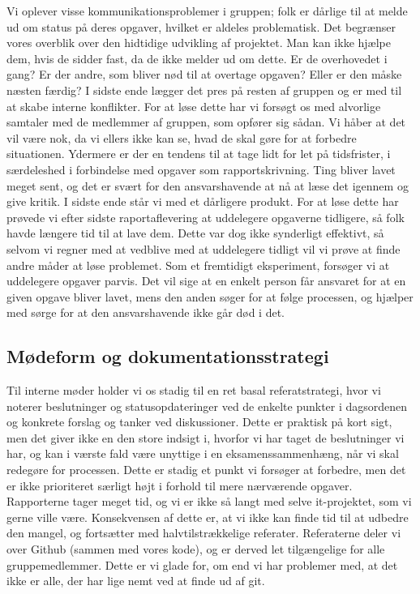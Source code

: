 \documentclass[10pt,a4paper,danish]{article}
\begin{document}
Vi oplever visse kommunikationsproblemer i gruppen; folk er dårlige til at melde ud om status på deres opgaver, hvilket er aldeles problematisk. Det begrænser vores overblik over den hidtidige udvikling af projektet. Man kan ikke hjælpe dem, hvis de sidder fast, da de ikke melder ud om dette. Er de overhovedet i gang? Er der andre, som bliver nød til at overtage opgaven? Eller er den måske næsten færdig? I sidste ende lægger det pres på resten af gruppen og er med til at skabe interne konflikter. For at løse dette har vi forsøgt os med alvorlige samtaler med de medlemmer af gruppen, som opfører sig sådan. Vi håber at det vil være nok, da vi ellers ikke kan se, hvad de skal gøre for at forbedre situationen. Ydermere er der en tendens til at tage lidt for let på tidsfrister, i særdeleshed i forbindelse med opgaver som rapportskrivning. Ting bliver lavet meget sent, og det er svært for den ansvarshavende at nå at læse det igennem og give kritik. I sidste ende står vi med et dårligere produkt. For at løse dette har prøvede vi efter sidste raportaflevering at uddelegere opgaverne tidligere, så folk havde længere tid til at lave dem. Dette var dog ikke synderligt effektivt, så selvom vi regner med at vedblive med at uddelegere tidligt vil vi prøve at finde andre måder at løse problemet. Som et fremtidigt eksperiment, forsøger vi at uddelegere opgaver parvis. Det vil sige at en enkelt person får ansvaret for at en given opgave bliver lavet, mens den anden søger for at følge processen, og hjælper med sørge for at den ansvarshavende ikke går død i det.

\subsection{Mødeform og dokumentationsstrategi} 
Til interne møder holder vi os stadig til en ret basal referatstrategi, hvor vi noterer beslutninger og statusopdateringer ved de enkelte punkter i dagsordenen og konkrete forslag og tanker ved diskussioner. Dette er praktisk på kort sigt, men det giver ikke en den store indsigt i, hvorfor vi har taget de beslutninger vi har, og kan i værste fald være unyttige i en eksamenssammenhæng, når vi skal redegøre for processen. Dette er stadig et punkt vi forsøger at forbedre, men det er ikke prioriteret særligt højt i forhold til mere nærværende opgaver. Rapporterne tager meget tid, og vi er ikke så langt med selve it-projektet, som vi gerne ville være. Konsekvensen af dette er, at vi ikke kan finde tid til at udbedre den mangel, og fortsætter med halvtilstrækkelige referater. Referaterne deler vi over Github (sammen med vores kode), og er derved let tilgængelige for alle gruppemedlemmer. Dette er vi glade for, om end vi har problemer med, at det ikke er alle, der har lige nemt ved at finde ud af git.
\end{document}
